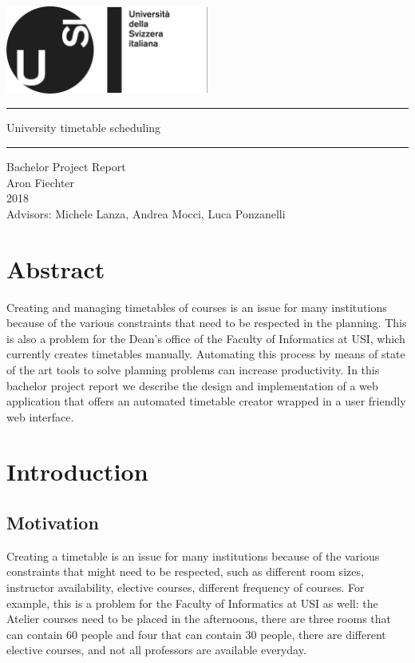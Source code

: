 \documentclass[12pt, a4paper, english]{report}
\begin{document}
\begin{titlepage}
\begin{center}
~\\[2cm]
\includegraphics[width=0.5\textwidth]{logo}\\[3.5cm]
\hrule height 1pt
\vspace{5mm}
{\Huge University timetable scheduling}
\vspace{3mm}
\hrule height 1pt
\vspace{1cm}
{\Large Bachelor Project Report}\\[3mm]
{\Large Aron Fiechter}\\[3mm]
{\Large 2018}\\[3.5cm]
{\large Advisors: Michele Lanza, Andrea Mocci, Luca Ponzanelli}
\end{center}
\end{titlepage}

\tableofcontents
\newpage

\section*{Abstract}
Creating and managing timetables of courses is an issue for many institutions because of the various constraints that need to be respected in the planning.
This is also a problem for the Dean's office of the Faculty of Informatics at USI, which currently creates timetables manually.
Automating this process by means of state of the art tools to solve planning problems can increase productivity.
In this bachelor project report we describe the design and implementation of a web application that offers an automated timetable creator wrapped in a user friendly web interface.

\newpage
\section{Introduction}
\subsection{Motivation}
Creating a timetable is an issue for many institutions because of the various constraints that might need to be respected, such as different room sizes, instructor availability, elective courses, different frequency of courses.
For example, this is a problem for the Faculty of Informatics at USI as well: the Atelier courses need to be placed in the afternoons, there are three rooms that can contain 60 people and four that can contain 30 people, there are different elective courses, and not all professors are available everyday.
\end{document}
